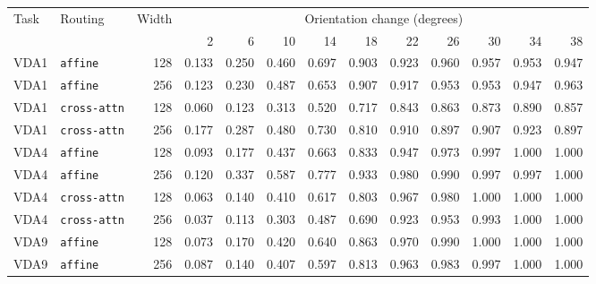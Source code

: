 \begingroup\scriptsize\setlength{\tabcolsep}{2.7pt}
\label{tab:absolute-behavior}
\begin{center}
\begin{tabular}{@{}llr*{10}{r}@{}}
\toprule
Task & Routing & Width & \multicolumn{10}{c}{Orientation change (degrees)} \\
\cmidrule(lr){4-13}
 & & & 2 & 6 & 10 & 14 & 18 & 22 & 26 & 30 & 34 & 38 \\ 
\midrule
VDA1 & \texttt{affine} & 128 & 0.133 & 0.250 & 0.460 & 0.697 & 0.903 & 0.923 & 0.960 & 0.957 & 0.953 & 0.947 \\
VDA1 & \texttt{affine} & 256 & 0.123 & 0.230 & 0.487 & 0.653 & 0.907 & 0.917 & 0.953 & 0.953 & 0.947 & 0.963 \\
VDA1 & \texttt{cross-attn} & 128 & 0.060 & 0.123 & 0.313 & 0.520 & 0.717 & 0.843 & 0.863 & 0.873 & 0.890 & 0.857 \\
VDA1 & \texttt{cross-attn} & 256 & 0.177 & 0.287 & 0.480 & 0.730 & 0.810 & 0.910 & 0.897 & 0.907 & 0.923 & 0.897 \\
VDA4 & \texttt{affine} & 128 & 0.093 & 0.177 & 0.437 & 0.663 & 0.833 & 0.947 & 0.973 & 0.997 & 1.000 & 1.000 \\
VDA4 & \texttt{affine} & 256 & 0.120 & 0.337 & 0.587 & 0.777 & 0.933 & 0.980 & 0.990 & 0.997 & 0.997 & 1.000 \\
VDA4 & \texttt{cross-attn} & 128 & 0.063 & 0.140 & 0.410 & 0.617 & 0.803 & 0.967 & 0.980 & 1.000 & 1.000 & 1.000 \\
VDA4 & \texttt{cross-attn} & 256 & 0.037 & 0.113 & 0.303 & 0.487 & 0.690 & 0.923 & 0.953 & 0.993 & 1.000 & 1.000 \\
VDA9 & \texttt{affine} & 128 & 0.073 & 0.170 & 0.420 & 0.640 & 0.863 & 0.970 & 0.990 & 1.000 & 1.000 & 1.000 \\
VDA9 & \texttt{affine} & 256 & 0.087 & 0.140 & 0.407 & 0.597 & 0.813 & 0.963 & 0.983 & 0.997 & 1.000 & 1.000 \\
\bottomrule
\end{tabular}
\end{center}
\endgroup
